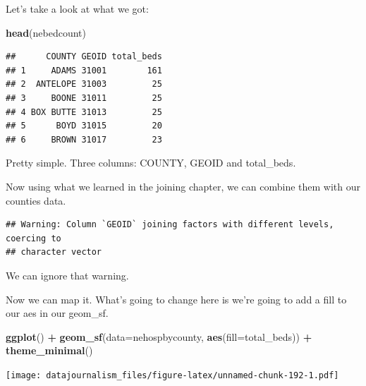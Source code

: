 \documentclass[]{book}
\newenvironment{Shaded}{\begin{snugshade}}{\end{snugshade}}
\newcommand{\DataTypeTok}[1]{\textcolor[rgb]{0.13,0.29,0.53}{#1}}
\newcommand{\KeywordTok}[1]{\textcolor[rgb]{0.13,0.29,0.53}{\textbf{#1}}}
\newcommand{\NormalTok}[1]{#1}
\newcommand{\OperatorTok}[1]{\textcolor[rgb]{0.81,0.36,0.00}{\textbf{#1}}}
\newcommand{\StringTok}[1]{\textcolor[rgb]{0.31,0.60,0.02}{#1}}
\begin{document}
Let's take a look at what we got:

\begin{Shaded}
\begin{Highlighting}[]
\KeywordTok{head}\NormalTok{(nebedcount)}
\end{Highlighting}
\end{Shaded}

\begin{verbatim}
##      COUNTY GEOID total_beds
## 1     ADAMS 31001        161
## 2  ANTELOPE 31003         25
## 3     BOONE 31011         25
## 4 BOX BUTTE 31013         25
## 5      BOYD 31015         20
## 6     BROWN 31017         23
\end{verbatim}

Pretty simple. Three columns: COUNTY, GEOID and total\_beds.

Now using what we learned in the joining chapter, we can combine them with our counties data.

\begin{Shaded}
\end{Shaded}

\begin{verbatim}
## Warning: Column `GEOID` joining factors with different levels, coercing to
## character vector
\end{verbatim}

We can ignore that warning.

Now we can map it. What's going to change here is we're going to add a fill to our aes in our geom\_sf.

\begin{Shaded}
\begin{Highlighting}[]
\KeywordTok{ggplot}\NormalTok{() }\OperatorTok{+}\StringTok{ }
\StringTok{  }\KeywordTok{geom_sf}\NormalTok{(}\DataTypeTok{data=}\NormalTok{nehospbycounty, }\KeywordTok{aes}\NormalTok{(}\DataTypeTok{fill=}\NormalTok{total_beds)) }\OperatorTok{+}\StringTok{ }
\StringTok{  }\KeywordTok{theme_minimal}\NormalTok{()}
\end{Highlighting}
\end{Shaded}

\texttt{[image: datajournalism\_files/figure-latex/unnamed-chunk-192-1.pdf]}
\end{document}
